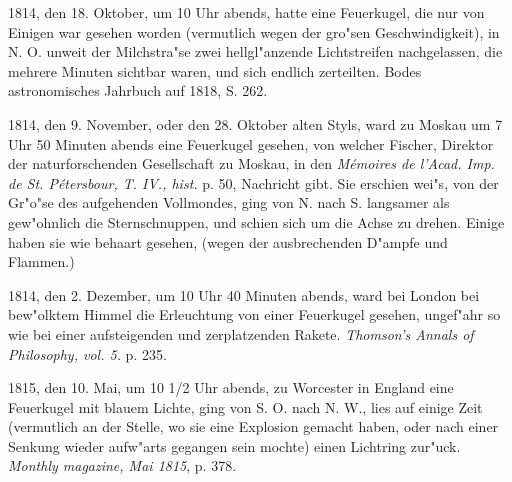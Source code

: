\documentclass[a4paper, 11pt, oneside, polutonikogreek, german]{article}
\begin{document}
1814, den 18. Oktober, um 10 Uhr abends, hatte eine Feuerkugel, die nur von Einigen war gesehen worden (vermutlich wegen der gro"sen Geschwindigkeit), in N. O. unweit der Milchstra"se zwei hellgl"anzende Lichtstreifen nachgelassen, die mehrere Minuten sichtbar waren, und sich endlich zerteilten. Bodes astronomisches Jahrbuch auf 1818, S. 262.

1814, den 9. November, oder den 28. Oktober alten Styls, ward zu Moskau um 7 Uhr 50 Minuten abends eine Feuerkugel gesehen, von welcher Fischer, Direktor der naturforschenden Gesellschaft zu Moskau, in den \emph{Mémoires de l'Acad. Imp. de St. Pétersbour, T. IV., hist.} p. 50, Nachricht gibt. Sie erschien wei"s, von der Gr"o"se des aufgehenden Vollmondes, ging von N. nach S. langsamer als gew"ohnlich die Sternschnuppen, und schien sich um die Achse zu drehen. Einige haben sie wie behaart gesehen, (wegen der ausbrechenden D"ampfe und Flammen.)

1814, den 2. Dezember, um 10 Uhr 40 Minuten abends, ward bei London bei bew"olktem Himmel die Erleuchtung von einer Feuerkugel gesehen, ungef"ahr so wie bei einer aufsteigenden und zerplatzenden Rakete. \emph{Thomson's Annals of Philosophy, vol. 5.} p. 235.

1815, den 10. Mai, um 10 1/2 Uhr abends, zu Worcester in England eine Feuerkugel mit blauem Lichte, ging von S. O. nach N. W., lies auf einige Zeit (vermutlich an der Stelle, wo sie eine Explosion gemacht haben, oder nach einer Senkung wieder aufw"arts gegangen sein mochte) einen Lichtring zur"uck. \emph{Monthly magazine, Mai 1815}, p. 378.
\end{document}
